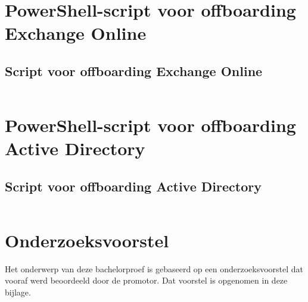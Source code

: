 \documentclass[dutch,dit,thesis]{hogentreport}
\begin{document}
%

\inputminted{powershell}{../scripts/DisableUser.ps1}

\chapter{PowerShell-script voor offboarding Exchange Online}

\section{Script voor offboarding Exchange Online}

%

\inputminted{powershell}{../scripts/SharedMailbox.ps1}

\chapter{PowerShell-script voor offboarding Active Directory}

\section{Script voor offboarding Active Directory}

%

\inputminted{powershell}{../scripts/DisableUser.ps1}

\chapter{Onderzoeksvoorstel}

Het onderwerp van deze bachelorproef is gebaseerd op een onderzoeksvoorstel dat vooraf werd beoordeeld door de promotor. Dat voorstel is opgenomen in deze bijlage.





%


\backmatter{}

\setlength\bibitemsep{2pt} %
\printbibliography[heading=bibintoc]
\end{document}

